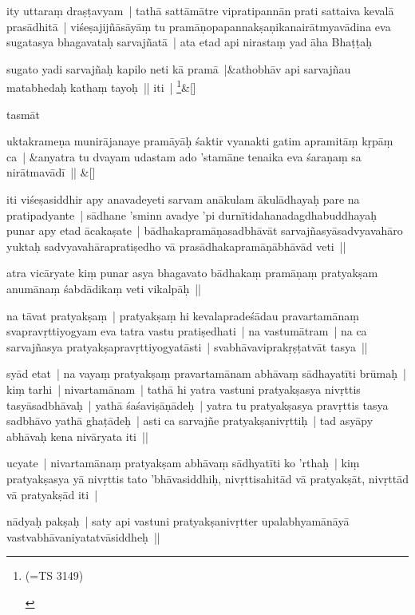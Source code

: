 \documentclass[article,12pt,a4paper]{memoir}
\begin{document}
	

	  \pstart ity uttaraṃ draṣṭavyam | tathā sattāmātre vipratipannān prati sattaiva kevalā prasādhitā | viśeṣajijñāsāyāṃ tu pramāṇopapannakṣaṇikanairātmyavādina eva sugatasya bhagavataḥ sarvajñatā | ata etad api nirastaṃ yad āha Bhaṭṭaḥ 
	\pend
      
	    
	    \stanza[\smallbreak]
	\label{rna-ts-3149}sugato yadi sarvajñaḥ kapilo neti kā pramā |&athobhāv api sarvajñau matabhedaḥ kathaṃ tayoḥ || iti | \footnote{\begin{english}(=TS 3149)\end{english}}\&[\smallbreak]


	

	  \pstart tasmāt 
	\pend
      
	    
	    \stanza[\smallbreak]
	uktakrameṇa munirājanaye pramāyāḥ śaktir vyanakti gatim apramitāṃ kṛpāṃ ca | &anyatra tu dvayam udastam ado 'stamāne tenaika eva śaraṇaṃ sa nirātmavādī || \&[\smallbreak]


	

	  \pstart iti viśeṣasiddhir apy anavadeyeti sarvam anākulam ākulādhayaḥ pare na pratipadyante | sādhane 'sminn avadye 'pi durnītidahanadagdhabuddhayaḥ punar apy etad ācakaṣate | bādhakapramāṇasadbhāvāt sarvajñasyāsadvyavahāro yuktaḥ sadvyavahārapratiṣedho vā prasādhakapramāṇābhāvād veti || 
	\pend
      

	  \pstart atra vicāryate kiṃ punar asya bhagavato bādhakaṃ pramāṇaṃ pratyakṣam anumānaṃ śabdādikaṃ veti vikalpāḥ || 
	\pend
      

	  \pstart na tāvat pratyakṣaṃ | pratyakṣaṃ hi kevalapradeśādau pravartamānaṃ svapravṛttiyogyam eva tatra vastu pratiṣedhati | na vastumātram | na ca sarvajñasya pratyakṣapravṛttiyogyatāsti | svabhāvaviprakṛṣṭatvāt tasya || 
	\pend
      

	  \pstart syād etat | na vayaṃ pratyakṣaṃ pravartamānam abhāvaṃ sādhayatīti brūmaḥ | kiṃ tarhi | nivartamānam | tathā hi yatra vastuni pratyakṣasya nivṛttis tasyāsadbhāvaḥ | yathā śaśaviṣāṇādeḥ | yatra tu pratyakṣasya pravṛttis tasya sadbhāvo yathā ghaṭādeḥ | asti ca sarvajñe pratyakṣanivṛttiḥ | tad asyāpy abhāvaḥ kena nivāryata iti || 
	\pend
      

	  \pstart ucyate | nivartamānaṃ pratyakṣam abhāvaṃ sādhyatīti ko 'rthaḥ | kiṃ pratyakṣasya yā nivṛttis tato 'bhāvasiddhiḥ, nivṛttisahitād vā pratyakṣāt, nivṛttād vā pratyakṣād iti | 
	\pend
      

	  \pstart nādyaḥ pakṣaḥ | saty api vastuni pratyakṣanivṛtter upalabhyamānāyā vastvabhāvaniyatatvāsiddheḥ || 
	\pend
      
\end{document}
